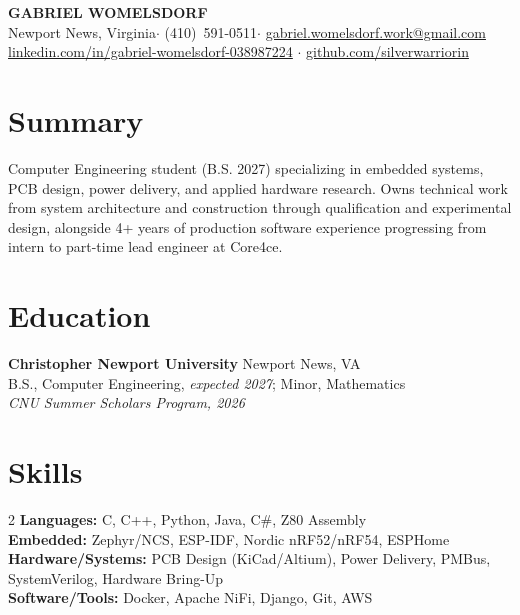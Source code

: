 \documentclass[10pt]{article}
\makeatletter
\newcommand{\name}{GABRIEL WOMELSDORF}
\newcommand{\citystate}{Newport News, Virginia}
\newcommand{\phone}{(410)~591-0511}
\newcommand{\email}{gabriel.womelsdorf.work@gmail.com}
\newcommand{\linkedin}{linkedin.com/in/gabriel-womelsdorf-038987224}
\newcommand{\github}{github.com/silverwarriorin}
\makeatother
\begin{document}
\begin{center}
  {\Large\bfseries \name}\\
  \citystate \quad $\cdot$ \quad \phone \quad $\cdot$ \quad
  \href{mailto:\email}{\email}\\
  \href{https://\linkedin}{\linkedin} \quad $\cdot$ \quad
  \href{https://\github}{\github}
\end{center}
\raggedright

\section*{Summary}
Computer Engineering student (B.S. 2027) specializing in embedded systems, PCB
design, power delivery, and applied hardware research. Owns technical work from
system architecture and construction through qualification and experimental
design, alongside 4+ years of production software experience progressing from
intern to part-time lead engineer at Core4ce.

\section*{Education}
\textbf{Christopher Newport University} \hfill Newport News, VA\\
B.S., Computer Engineering, \emph{expected 2027}; Minor, Mathematics\\
\emph{CNU Summer Scholars Program, 2026}

\section*{Skills}
\vspace{-8pt}
\begin{multicols}{2}
\textbf{Languages:} C, C++, Python, Java, C\#, Z80 Assembly \\
\textbf{Embedded:} Zephyr/NCS, ESP-IDF, Nordic nRF52/nRF54, ESPHome \\

\textbf{Hardware/Systems:} PCB Design (KiCad/Altium), Power Delivery, PMBus,
SystemVerilog, Hardware Bring-Up \\
\textbf{Software/Tools:} Docker, Apache NiFi, Django, Git, AWS
\end{multicols}

\vspace{-10pt}
\end{document}
